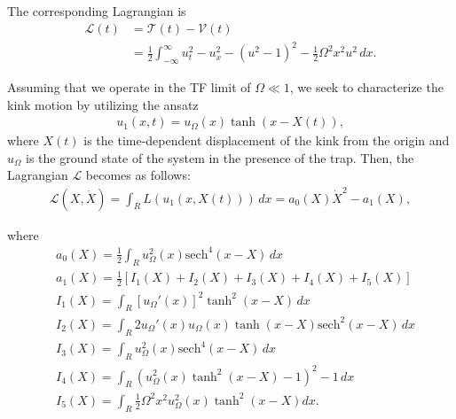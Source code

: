 \documentclass[vecphys]{svmult}		%
\newcommand{\sech}{\text{sech}}
\begin{document}
The corresponding Lagrangian is
\begin{equation}\label{lagr}
\begin{aligned}
\mathcal{L}(t) &= \mathcal {T}(t) - \mathcal {V}(t)\\
&= \frac{1}{2}\int_{-\infty}^\infty u_t^2 - u_x^2 - (u^2-1)^2 - \frac{1}{2}\Omega^2 x^2u^2 \, dx.
\end{aligned}
\end{equation}

Assuming that we operate in the TF limit of $\Omega \ll 1$,
we seek to characterize the kink motion by utilizing  the ansatz
\begin{align*}
u_1(x,t) = u_\Omega(x) \tanh(x - X(t)),
\end{align*}
where $X(t)$ is the time-dependent displacement of the kink from the origin and $u_{\Omega}$ is the ground state of the system in the presence of the trap.
Then, the Lagrangian $\mathcal L$  becomes as follows:
\begin{align*}
\mathcal{L}(X,\dot X) = \int_{R} L(u_1(x,X(t))) \, dx =  a_0(X)\dot X^2 - a_1(X), 
\end{align*}



where
\begin{align*}
&a_0(X) = \frac{1}{2}\int_{R} u_{\Omega}^2(x)\sech^4(x-X) \, dx \\
&a_1(X) = \frac{1}{2} [I_1(X) + I_2(X) + I_3(X)+I_4(X)+I_5(X)] \\
&I_1(X) = \int_{R} [u_{\Omega}'(x)]^2 \tanh^2(x-X) \, dx \\
&I_2(X) = \int_{R} 2u_\Omega'(x)u_\Omega(x)\tanh(x-X)\sech^2(x-X) \, dx \\
&I_3(X) = \int_{R} u_{\Omega}^2(x)\sech^4(x-X) \, dx \\
&I_4(X) = \int_{R} (u_{\Omega}^2(x)\tanh^2(x-X)-1)^2-1 \, dx \\
&I_5(X) = \int_{R} \frac{1}{2}\Omega^2 x^2 u_{\Omega}^2(x)\tanh^2(x-X) dx.  
\end{align*}
\end{document}
